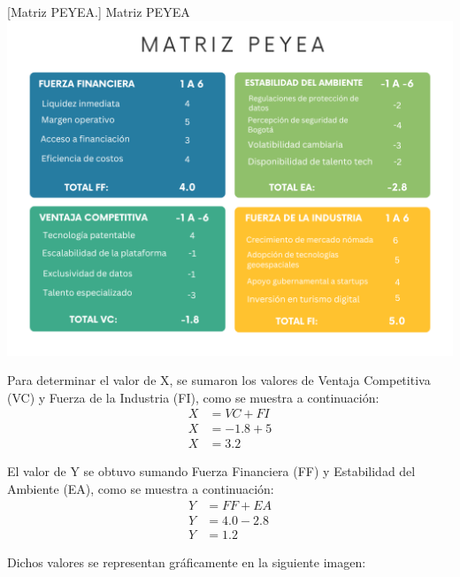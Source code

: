 \vspace{2mm}
\begin{minipage}{0.9\textwidth}
\centering
{}[{Matriz PEYEA.}]{ Matriz PEYEA }
\label{peyea}
\includegraphics[scale=0.5]{Content/Images/Matriz PEYEA.png}
\end{minipage}

Para determinar el valor de X, se sumaron los valores de Ventaja Competitiva (VC) y Fuerza de la Industria (FI), como se muestra a continuación:
\begin{align*}
X &= VC + FI \\
X &= -1.8 + 5 \\
X &= 3.2
\end{align*}

El valor de Y se obtuvo sumando Fuerza Financiera (FF) y Estabilidad del Ambiente (EA), como se muestra a continuación:
\begin{align*}
Y &= FF + EA \\
Y &= 4.0 - 2.8 \\
Y &= 1.2
\end{align*}

Dichos valores se representan gráficamente en la siguiente imagen:

